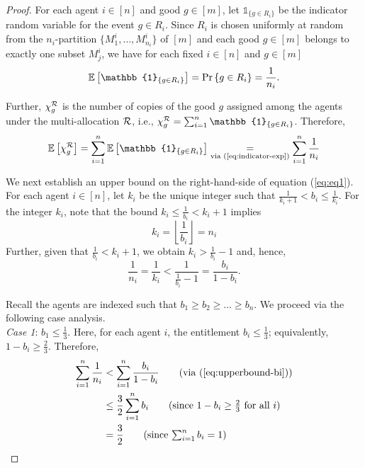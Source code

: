 \begin{proof}
    For each agent $i\in [n]$ and good $g\in [m]$, let $\mathbb{1}_{\{g \in R_i\}}$ be the indicator random variable for the event $g\in R_i$. Since $R_i$ is chosen uniformly at random from the $n_i$-partition $\{M^i_1,\dots,M^i_{n_i}\}$ of $[m]$ and each good $g\in [m]$ belongs to exactly one subset $M^i_j$, we have for each fixed $i\in [n]$ and $g \in [m]$
\begin{equation}
    \expval{\mathbb{1}_{\{g\in R_i\}}} = \prob{g \in R_i} = \frac{1}{n_i}. \label{eq:indicator-exp}
\end{equation}

Further, $\chi^{\mathcal{R}}_g$ is the number of copies of the good $g$ assigned among the agents under the multi-allocation $\mathcal{R}$, i.e., $\chi^\calR_g = \sum_{i=1}^n \mathbb{1}_{\{g \in R_i\}}$.  Therefore, 
\begin{equation}
\label{eq:eq1} \expval{\chi^\calR_g} = \sum_{i=1}^n \expval{\mathbb{1}_{ \{ g \in R_i \} }} 
\underset{\text{via (\ref{eq:indicator-exp})}}{=} \sum_{i=1}^n \frac{1}{n_i}
\end{equation}

We next establish an upper bound on the right-hand-side of equation (\ref{eq:eq1}). For each agent $i \in [n]$, let $k_i$ be the unique integer such that $\frac{1}{k_i+1} < b_i \leq \frac{1}{k_i}$. For the integer $k_i$, note that the bound $k_i \leq \frac{1}{b_i} < k_i + 1$ implies  
\begin{equation}
    k_i = \left\lfloor \frac{1}{b_i} \right\rfloor = n_i \label{eq:ni-value}
\end{equation}
Further, given that $\frac{1}{b_i} < k_i +1$, we obtain  $k_i > \frac{1}{b_i} -1$ and, hence, 
\begin{equation}
    \frac{1}{n_i} = \frac{1}{k_i} < \frac{1}{\frac{1}{b_i} - 1} = \frac{b_i}{1 - b_i}. \label{eq:upperbound-bi}
\end{equation}

Recall the agents are indexed such that $b_1 \geq b_2 \geq \dots \geq b_n$. We proceed via the following case analysis.\\

\noindent\textit{Case 1}: $b_1 \leq \frac{1}{3}$. Here, for each agent $i$, the entitlement $b_i \leq \frac{1}{3}$; equivalently, $1-b_i \geq \frac{2}{3}$. Therefore, 
\begin{align*}
\sum_{i=1}^n \frac{1}{n_i} 
& < \sum_{i=1}^n \frac{b_i}{1-b_i} \tag{via (\ref{eq:upperbound-bi})} \\
&\leq \frac{3}{2} \sum_{i=1}^n b_i \tag{since $1-b_i \geq \frac{2}{3}$ for all $i$} \\
&= \frac{3}{2} \tag{since $\sum_{i=1}^n b_i = 1$}
\end{align*}


\end{proof}
